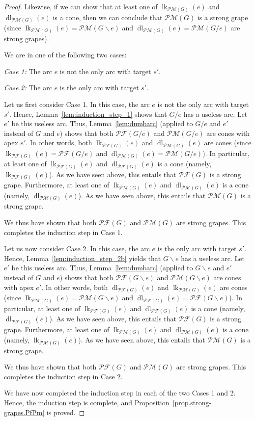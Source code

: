 \documentclass[12pt]{amsart}
\theoremstyle{definition}
\DeclareMathOperator{\lk}{lk}
\DeclareMathOperator{\dl}{dl}
\newcommand{\Pm}[1]{\mathcal{PM}\left(#1\right)}
\newcommand{\Pf}[1]{\mathcal{PF}\left(#1\right)}
\begin{document}
\begin{proof}
Likewise, if we can show that at least one of
$\lk_{\Pm{G}}(e)$ and $\dl_{\Pm{G}}(e)$ is a cone,
then we can conclude that $\Pm{G}$ is a strong grape
(since $\lk_{\Pm{G}}(e) = \Pm{G \backslash e}$ and
$\dl_{\Pm{G}}(e) = \Pm{G / e}$ are strong grapes).

We are in one of the following two cases:

\textit{Case 1:} The arc $e$ is not the only arc with target $s'$.

\textit{Case 2:} The arc $e$ is the only arc with target $s'$.

Let us first consider Case 1.
In this case, the arc $e$ is not the only arc with target $s'$.
Hence, Lemma~\ref{lem:induction_step_1} shows that
$G / e$ has a useless arc.
Let $e'$ be this useless arc.
Thus, Lemma~\ref{lem:dumbarc} (applied to $G / e$ and $e'$ instead
of $G$ and $e$) shows that
both $\Pf{G / e}$ and $\Pm{G / e}$ are cones with apex $e'$.
In other words,
both $\lk_{\Pf{G}}(e)$ and $\dl_{\Pm{G}}(e)$ are cones
(since $\lk_{\Pf{G}}(e) = \Pf{G / e}$
and $\dl_{\Pm{G}}(e) = \Pm{G / e}$).
%
In particular, at least one of
$\lk_{\Pf{G}}(e)$ and $\dl_{\Pf{G}}(e)$ is a cone
(namely, $\lk_{\Pf{G}}(e)$).
As we have seen above, this entails that $\Pf{G}$ is a strong grape.
%
Furthermore, at least one of
$\lk_{\Pm{G}}(e)$ and $\dl_{\Pm{G}}(e)$ is a cone
(namely, $\dl_{\Pm{G}}(e)$).
As we have seen above, this entails that $\Pm{G}$ is a strong grape.

We thus have shown that
both $\Pf{G}$ and $\Pm{G}$ are strong grapes.
This completes the induction step in Case 1.

Let us now consider Case 2.
In this case, the arc $e$ is the only arc with target $s'$.
%
Hence, Lemma~\ref{lem:induction_step_2b} yields that
$G \backslash e$ has a useless arc.
Let $e'$ be this useless arc.
Thus, Lemma~\ref{lem:dumbarc} (applied to $G \backslash e$ and $e'$ instead
of $G$ and $e$) shows that
both $\Pf{G \backslash e}$ and $\Pm{G \backslash e}$ are cones with apex $e'$.
In other words,
both $\dl_{\Pf{G}}(e)$ and $\lk_{\Pm{G}}(e)$ are cones
(since $\lk_{\Pm{G}}(e) = \Pm{G \backslash e}$
and $\dl_{\Pf{G}}(e) = \Pf{G \backslash e}$).
%
In particular, at least one of
$\lk_{\Pf{G}}(e)$ and $\dl_{\Pf{G}}(e)$ is a cone
(namely, $\dl_{\Pf{G}}(e)$).
As we have seen above, this entails that $\Pf{G}$ is a strong grape.
%
Furthermore, at least one of
$\lk_{\Pm{G}}(e)$ and $\dl_{\Pm{G}}(e)$ is a cone
(namely, $\lk_{\Pm{G}}(e)$).
As we have seen above, this entails that $\Pm{G}$ is a strong grape.

We thus have shown that
both $\Pf{G}$ and $\Pm{G}$ are strong grapes.
This completes the induction step in Case 2.

We have now completed the induction step in each of
the two Cases 1 and 2.
Hence, the induction step is complete,
and Proposition~\ref{prop.strong-grapes.PfPm} is proved.
\end{proof}
\end{document}
